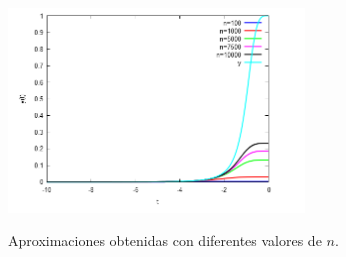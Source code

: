 {
	
	\begin{frame}
		\begin{figure}[H]
			\centering
			\includegraphics[width=0.7\textwidth]{./Images/eulermaxima.png}
			\label{fig:euler}
			\caption{Aproximaciones obtenidas con diferentes valores de $n$.}
		\end{figure}
	\end{frame}
}